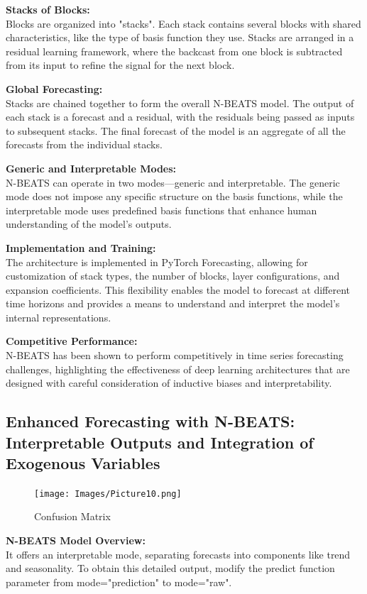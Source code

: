 \documentclass{article}
\begin{document}
\textbf{Stacks of Blocks:} \\
Blocks are organized into "stacks". Each stack contains several blocks with shared characteristics, like the type of basis function they use. Stacks are arranged in a residual learning framework, where the backcast from one block is subtracted from its input to refine the signal for the next block.

\textbf{Global Forecasting:} \\
Stacks are chained together to form the overall N-BEATS model. The output of each stack is a forecast and a residual, with the residuals being passed as inputs to subsequent stacks. The final forecast of the model is an aggregate of all the forecasts from the individual stacks.

\textbf{Generic and Interpretable Modes:} \\
N-BEATS can operate in two modes—generic and interpretable. The generic mode does not impose any specific structure on the basis functions, while the interpretable mode uses predefined basis functions that enhance human understanding of the model's outputs.

\textbf{Implementation and Training:} \\
The architecture is implemented in PyTorch Forecasting, allowing for customization of stack types, the number of blocks, layer configurations, and expansion coefficients. This flexibility enables the model to forecast at different time horizons and provides a means to understand and interpret the model's internal representations.

\textbf{Competitive Performance:} \\
N-BEATS has been shown to perform competitively in time series forecasting challenges, highlighting the effectiveness of deep learning architectures that are designed with careful consideration of inductive biases and interpretability.

\subsection{Enhanced Forecasting with N-BEATS: Interpretable Outputs and Integration of Exogenous Variables}

\begin{figure}
    \centering
    \texttt{[image: Images/Picture10.png]}
    \caption{Confusion Matrix}
    \label{fig:enter-labe}
\end{figure}


\textbf{N-BEATS Model Overview:} \\
It offers an interpretable mode, separating forecasts into components like trend and seasonality. To obtain this detailed output, modify the predict function parameter from mode="prediction" to mode="raw".
\end{document}
